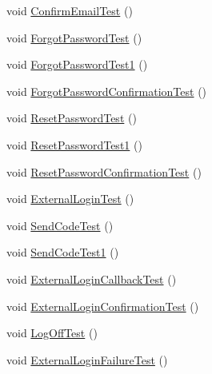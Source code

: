 \begin{DoxyCompactItemize}
\item 
void \mbox{\hyperlink{class_brew_day2_1_1_controllers_1_1_tests_1_1_account_controller_tests_a7efacd06b4ecd8a32aa3d0677d2e603e}{Confirm\+Email\+Test}} ()
\item 
void \mbox{\hyperlink{class_brew_day2_1_1_controllers_1_1_tests_1_1_account_controller_tests_acc1586c252f3ca5985774964ff1a71ff}{Forgot\+Password\+Test}} ()
\item 
void \mbox{\hyperlink{class_brew_day2_1_1_controllers_1_1_tests_1_1_account_controller_tests_a3bb639a60c911a47e2f04bfbc7d093b6}{Forgot\+Password\+Test1}} ()
\item 
void \mbox{\hyperlink{class_brew_day2_1_1_controllers_1_1_tests_1_1_account_controller_tests_ae2c23ded0ad5be15385749a3b989992a}{Forgot\+Password\+Confirmation\+Test}} ()
\item 
void \mbox{\hyperlink{class_brew_day2_1_1_controllers_1_1_tests_1_1_account_controller_tests_ab1cbb1ed053c7dad54aadcbaee285de6}{Reset\+Password\+Test}} ()
\item 
void \mbox{\hyperlink{class_brew_day2_1_1_controllers_1_1_tests_1_1_account_controller_tests_acd3916d350a1cf0e518defa80257ba1a}{Reset\+Password\+Test1}} ()
\item 
void \mbox{\hyperlink{class_brew_day2_1_1_controllers_1_1_tests_1_1_account_controller_tests_a98d28cf62ed653289369ca0fb3b99511}{Reset\+Password\+Confirmation\+Test}} ()
\item 
void \mbox{\hyperlink{class_brew_day2_1_1_controllers_1_1_tests_1_1_account_controller_tests_a06dc15fa031c3a8797073917ef1618e7}{External\+Login\+Test}} ()
\item 
void \mbox{\hyperlink{class_brew_day2_1_1_controllers_1_1_tests_1_1_account_controller_tests_a0a9ce20e6cd4aa79ba1f5ef7e097acb6}{Send\+Code\+Test}} ()
\item 
void \mbox{\hyperlink{class_brew_day2_1_1_controllers_1_1_tests_1_1_account_controller_tests_a569a2eff2e7f7546f247ce907bb3cb38}{Send\+Code\+Test1}} ()
\item 
void \mbox{\hyperlink{class_brew_day2_1_1_controllers_1_1_tests_1_1_account_controller_tests_a378c406438691ac2c765659646016c41}{External\+Login\+Callback\+Test}} ()
\item 
void \mbox{\hyperlink{class_brew_day2_1_1_controllers_1_1_tests_1_1_account_controller_tests_adf88b5ec2f0516e74ae9c7b749aa56b5}{External\+Login\+Confirmation\+Test}} ()
\item 
void \mbox{\hyperlink{class_brew_day2_1_1_controllers_1_1_tests_1_1_account_controller_tests_a217d9cf4640a2a91dd64fb5a06b819f0}{Log\+Off\+Test}} ()
\item 
void \mbox{\hyperlink{class_brew_day2_1_1_controllers_1_1_tests_1_1_account_controller_tests_a57f0cf13c0c9d0913fb0a4fd8ff7a162}{External\+Login\+Failure\+Test}} ()
\end{DoxyCompactItemize}


